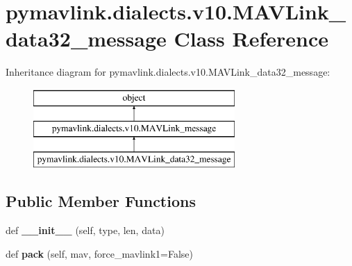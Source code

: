 \hypertarget{classpymavlink_1_1dialects_1_1v10_1_1MAVLink__data32__message}{}\section{pymavlink.\+dialects.\+v10.\+M\+A\+V\+Link\+\_\+data32\+\_\+message Class Reference}
\label{classpymavlink_1_1dialects_1_1v10_1_1MAVLink__data32__message}
Inheritance diagram for pymavlink.\+dialects.\+v10.\+M\+A\+V\+Link\+\_\+data32\+\_\+message\+:\begin{figure}[H]
\begin{center}
\leavevmode
\includegraphics[height=3.000000cm]{classpymavlink_1_1dialects_1_1v10_1_1MAVLink__data32__message}
\end{center}
\end{figure}
\subsection*{Public Member Functions}
\begin{DoxyCompactItemize}
\item 
\mbox{\label{classpymavlink_1_1dialects_1_1v10_1_1MAVLink__data32__message_af0057e23c684d991f5b1fb847aa3ff25}} 
def {\bfseries \+\_\+\+\_\+init\+\_\+\+\_\+} (self, type, len, data)
\item 
\mbox{\label{classpymavlink_1_1dialects_1_1v10_1_1MAVLink__data32__message_ae421fee6ec81fd85f4664526dd490b89}} 
def {\bfseries pack} (self, mav, force\+\_\+mavlink1=False)
\end{DoxyCompactItemize}
